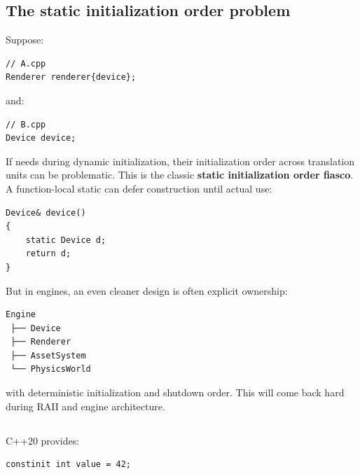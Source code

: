 \subsection{The static initialization order problem}\label{01-foundations-i-ch002-the-static-initialization-order-problem}

\hypertarget{01-foundations-i-ch002-the-static-initialization-order-problem}{}

Suppose:

\begin{verbatim}
// A.cpp
Renderer renderer{device};
\end{verbatim}

and:

\begin{verbatim}
// B.cpp
Device device;
\end{verbatim}

If  needs  during dynamic initialization, their initialization order across translation units can be problematic. This is the classic \textbf{static initialization order fiasco}. A function-local static can defer construction until actual use:

\begin{verbatim}
Device& device()
{
    static Device d;
    return d;
}
\end{verbatim}

But in engines, an even cleaner design is often explicit ownership:

\begin{verbatim}
Engine
 ├── Device
 ├── Renderer
 ├── AssetSystem
 └── PhysicsWorld
\end{verbatim}

with deterministic initialization and shutdown order. This will come back hard during RAII and engine architecture.

\subsection{\texorpdfstring{}{}}\label{01-foundations-i-ch002-constinit}

\hypertarget{01-foundations-i-ch002-constinit}{}

C++20 provides:

\begin{verbatim}
constinit int value = 42;
\end{verbatim}

